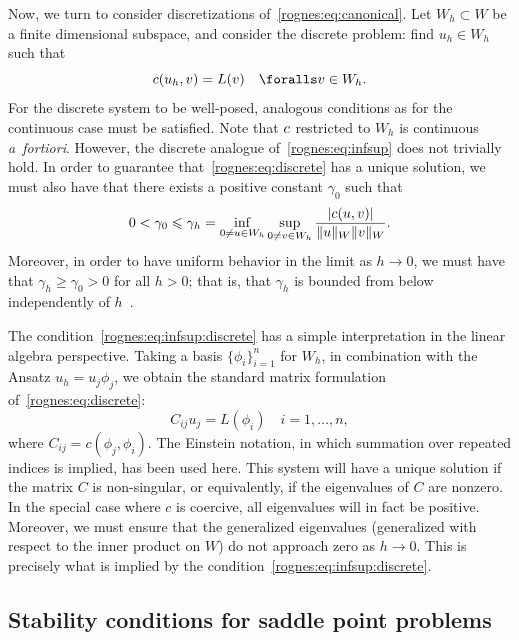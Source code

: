 Now, we turn to consider discretizations
of~\eqref{rognes:eq:canonical}. Let $W_h \subset W$ be a finite
dimensional subspace, and consider the discrete problem: find $u_h \in
W_h$ such that
\begin{equation}
  \label{rognes:eq:discrete}
  \rognesc(u_h, v) = L(v) \quad \foralls v \in W_h.
\end{equation}
For the discrete system to be well-posed, analogous conditions as for
the continuous case must be satisfied. Note that $c$ restricted
to $W_h$ is continuous \emph{a~fortiori}. However, the discrete
analogue of~\eqref{rognes:eq:infsup} does not trivially hold. In order
to guarantee that~\eqref{rognes:eq:discrete} has a unique solution, we
must also have that there exists a positive constant $\gamma_0$ such
that
\begin{equation}
  \label{rognes:eq:infsup:discrete}
  0 < \gamma_0 \leqslant \gamma_h = \inf_{0 \not = u \in W_h} \sup_{0
    \not = v \in W_h} \frac{|c(u, v)|}{\|u\|_{W}\|v\|_{W}}.
\end{equation}
Moreover, in order to have uniform behavior in the limit as $h
\rightarrow 0$, we must have that $\gamma_h \geqslant \gamma_0 > 0$ for all
$h > 0$; that is, that $\gamma_h$ is bounded from below independently
of $h$~\citep{Babuvska1972/73}.

The condition~\eqref{rognes:eq:infsup:discrete} has a simple
interpretation in the linear algebra perspective. Taking a basis
$\{\phi_i \}_{i=1}^n$ for $W_h$, in combination with the Ansatz $u_h =
u_j \phi_j$, we obtain the standard matrix formulation
of~\eqref{rognes:eq:discrete}:
\begin{equation}
  C_{ij} u_j = L(\phi_i) \quad i = 1, \dots, n,
\end{equation}
where $C_{ij} = c(\phi_j, \phi_i)$. The Einstein notation, in which
summation over repeated indices is implied, has been used here. This
system will have a unique solution if the matrix $C$ is non-singular,
or equivalently, if the eigenvalues of $C$ are nonzero. In the
special case where $c$ is coercive, all eigenvalues will in fact be
positive. Moreover, we must ensure that the generalized eigenvalues
(generalized with respect to the inner product on $W$) do not approach
zero as $h \rightarrow 0$. This is precisely what is implied by the
condition~\eqref{rognes:eq:infsup:discrete}.

\subsection{Stability conditions for saddle point problems}

